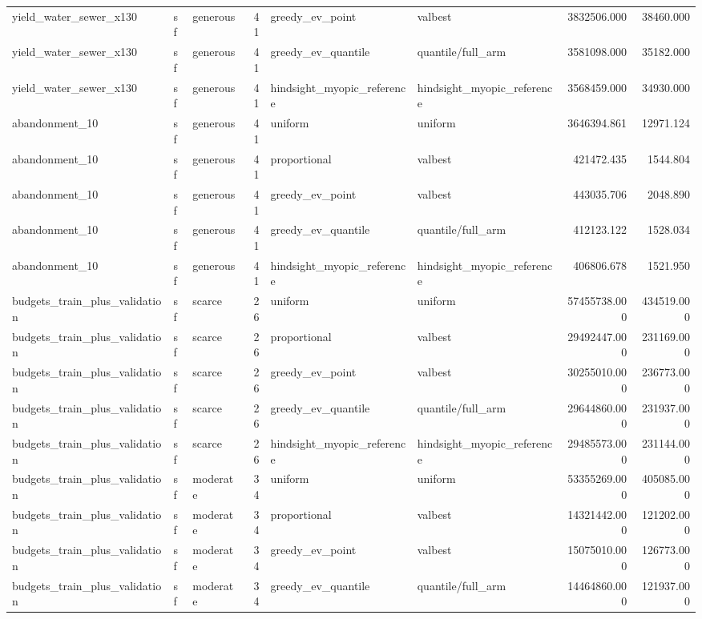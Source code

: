 \begin{tabular}{lllrllrr}
yield\_water\_sewer\_x130 & sf & generous & 41 & greedy\_ev\_point & valbest & 3832506.000 & 38460.000 \\
yield\_water\_sewer\_x130 & sf & generous & 41 & greedy\_ev\_quantile & quantile/full\_arm & 3581098.000 & 35182.000 \\
yield\_water\_sewer\_x130 & sf & generous & 41 & hindsight\_myopic\_reference & hindsight\_myopic\_reference & 3568459.000 & 34930.000 \\
abandonment\_10 & sf & generous & 41 & uniform & uniform & 3646394.861 & 12971.124 \\
abandonment\_10 & sf & generous & 41 & proportional & valbest & 421472.435 & 1544.804 \\
abandonment\_10 & sf & generous & 41 & greedy\_ev\_point & valbest & 443035.706 & 2048.890 \\
abandonment\_10 & sf & generous & 41 & greedy\_ev\_quantile & quantile/full\_arm & 412123.122 & 1528.034 \\
abandonment\_10 & sf & generous & 41 & hindsight\_myopic\_reference & hindsight\_myopic\_reference & 406806.678 & 1521.950 \\
budgets\_train\_plus\_validation & sf & scarce & 26 & uniform & uniform & 57455738.000 & 434519.000 \\
budgets\_train\_plus\_validation & sf & scarce & 26 & proportional & valbest & 29492447.000 & 231169.000 \\
budgets\_train\_plus\_validation & sf & scarce & 26 & greedy\_ev\_point & valbest & 30255010.000 & 236773.000 \\
budgets\_train\_plus\_validation & sf & scarce & 26 & greedy\_ev\_quantile & quantile/full\_arm & 29644860.000 & 231937.000 \\
budgets\_train\_plus\_validation & sf & scarce & 26 & hindsight\_myopic\_reference & hindsight\_myopic\_reference & 29485573.000 & 231144.000 \\
budgets\_train\_plus\_validation & sf & moderate & 34 & uniform & uniform & 53355269.000 & 405085.000 \\
budgets\_train\_plus\_validation & sf & moderate & 34 & proportional & valbest & 14321442.000 & 121202.000 \\
budgets\_train\_plus\_validation & sf & moderate & 34 & greedy\_ev\_point & valbest & 15075010.000 & 126773.000 \\
budgets\_train\_plus\_validation & sf & moderate & 34 & greedy\_ev\_quantile & quantile/full\_arm & 14464860.000 & 121937.000 \\

\end{tabular}
